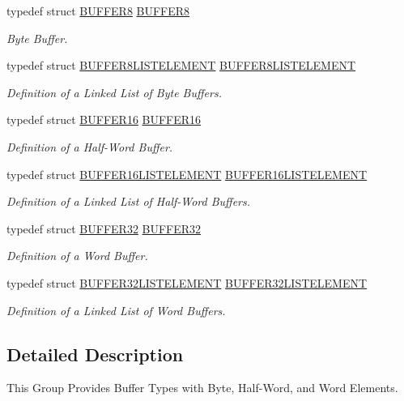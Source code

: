 \begin{DoxyCompactItemize}
\item 
typedef struct \hyperlink{a00006}{BUFFER8} \hyperlink{a00654_gaa4fdb17d0c3544bbb3e8e9dabe0bb1f6}{BUFFER8}
\begin{DoxyCompactList}\small\item\em Byte Buffer. \end{DoxyCompactList}\item 
typedef struct \hyperlink{a00007}{BUFFER8LISTELEMENT} \hyperlink{a00654_ga908a8d75645fed38ef8093ab5674e461}{BUFFER8LISTELEMENT}
\begin{DoxyCompactList}\small\item\em Definition of a Linked List of Byte Buffers. \end{DoxyCompactList}\item 
typedef struct \hyperlink{a00002}{BUFFER16} \hyperlink{a00654_ga6ae39c7a97b24f77641192efbb669b38}{BUFFER16}
\begin{DoxyCompactList}\small\item\em Definition of a Half-\/Word Buffer. \end{DoxyCompactList}\item 
typedef struct \hyperlink{a00003}{BUFFER16LISTELEMENT} \hyperlink{a00654_gab4aef119192d21e626da2b0c12802f39}{BUFFER16LISTELEMENT}
\begin{DoxyCompactList}\small\item\em Definition of a Linked List of Half-\/Word Buffers. \end{DoxyCompactList}\item 
typedef struct \hyperlink{a00004}{BUFFER32} \hyperlink{a00654_ga5be842975bd489db6d6d6af54e8114fd}{BUFFER32}
\begin{DoxyCompactList}\small\item\em Definition of a Word Buffer. \end{DoxyCompactList}\item 
typedef struct \hyperlink{a00005}{BUFFER32LISTELEMENT} \hyperlink{a00654_ga9c77331cdbe545e46e5adaaf848b1170}{BUFFER32LISTELEMENT}
\begin{DoxyCompactList}\small\item\em Definition of a Linked List of Word Buffers. \end{DoxyCompactList}\end{DoxyCompactItemize}


\subsection{Detailed Description}
This Group Provides Buffer Types with Byte, Half-\/Word, and Word Elements. 

